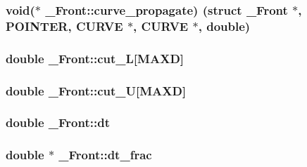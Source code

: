 \subsubsection[{\texorpdfstring{curve\+\_\+propagate}{curve_propagate}}]{\setlength{\rightskip}{0pt plus 5cm}void($\ast$ \+\_\+\+Front\+::curve\+\_\+propagate) (struct {\bf \+\_\+\+Front} $\ast$, {\bf P\+O\+I\+N\+T\+ER}, {\bf C\+U\+R\+VE} $\ast$, {\bf C\+U\+R\+VE} $\ast$, double)}\hypertarget{struct___front_ae5f2260b69f5eb1e92b09eedf50b5e29}{}\label{struct___front_ae5f2260b69f5eb1e92b09eedf50b5e29}
\subsubsection[{\texorpdfstring{cut\+\_\+L}{cut_L}}]{\setlength{\rightskip}{0pt plus 5cm}double \+\_\+\+Front\+::cut\+\_\+L\mbox{[}{\bf M\+A\+XD}\mbox{]}}\hypertarget{struct___front_a6837cc67dcef6f3d7b0e9583e6b20b0b}{}\label{struct___front_a6837cc67dcef6f3d7b0e9583e6b20b0b}
\subsubsection[{\texorpdfstring{cut\+\_\+U}{cut_U}}]{\setlength{\rightskip}{0pt plus 5cm}double \+\_\+\+Front\+::cut\+\_\+U\mbox{[}{\bf M\+A\+XD}\mbox{]}}\hypertarget{struct___front_ae038ba83c6529dbbf4aaad0ed5c4ff05}{}\label{struct___front_ae038ba83c6529dbbf4aaad0ed5c4ff05}
\subsubsection[{\texorpdfstring{dt}{dt}}]{\setlength{\rightskip}{0pt plus 5cm}double \+\_\+\+Front\+::dt}\hypertarget{struct___front_ae83827206e60b9379b1e4ae3f725b37d}{}\label{struct___front_ae83827206e60b9379b1e4ae3f725b37d}
\subsubsection[{\texorpdfstring{dt\+\_\+frac}{dt_frac}}]{\setlength{\rightskip}{0pt plus 5cm}double $\ast$ \+\_\+\+Front\+::dt\+\_\+frac}\hypertarget{struct___front_a7ac13f64ab021896c07878bbbdadb7eb}{}\label{struct___front_a7ac13f64ab021896c07878bbbdadb7eb}
